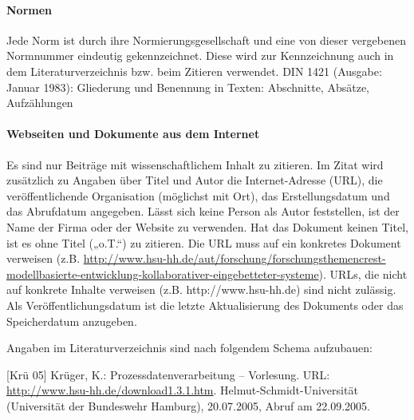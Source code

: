 \paragraph{Normen}
Jede Norm ist durch ihre Normierungsgesellschaft und eine von dieser vergebenen Normnummer eindeutig gekennzeichnet. Diese wird zur Kennzeichnung auch in dem Literaturverzeichnis bzw. beim Zitieren verwendet.
DIN 1421 (Ausgabe: Januar 1983): Gliederung und Benennung in Texten: Abschnitte, Absätze, Aufzählungen
\paragraph{Webseiten und Dokumente aus dem Internet} 
Es sind nur Beiträge mit wissenschaftlichem Inhalt zu zitieren. Im Zitat wird zusätzlich zu Angaben über Titel und Autor die Internet-Adresse (URL), die veröffentlichende Organisation (möglichst mit Ort), das Erstellungsdatum und das Abrufdatum angegeben.
Lässt sich keine Person als Autor feststellen, ist der Name der Firma oder der Website zu verwenden. Hat das Dokument keinen Titel, ist es ohne Titel („o.T.“) zu zitieren. Die URL muss auf ein konkretes Dokument verweisen (z.B. \url{http://www.hsu-hh.de/aut/forschung/forschungsthemencrest-modellbasierte-entwicklung-kollaborativer-eingebetteter-systeme}). URLs, die nicht auf konkrete Inhalte verweisen (z.B. http://www.hsu-hh.de) sind nicht zulässig. Als Veröffentlichungsdatum ist die letzte Aktualisierung des Dokuments oder das Speicherdatum anzugeben. 

Angaben im Literaturverzeichnis sind nach folgendem Schema aufzubauen: 

[Krü 05] Krüger, K.: Prozessdatenverarbeitung – Vorlesung. URL: \url{http://www.hsu-hh.de/download1.3.1.htm}. Helmut-Schmidt-Universität (Universität der Bundeswehr Hamburg), 20.07.2005, Abruf am 22.09.2005.
